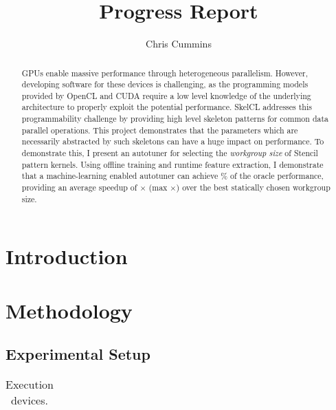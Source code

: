 
\title{Progress Report}

\author{Chris Cummins}





\maketitle

\begin{abstract}
  \noindent
  GPUs enable massive performance through heterogeneous
  parallelism. However, developing software for these devices is
  challenging, as the programming models provided by OpenCL and CUDA
  require a low level knowledge of the underlying architecture to
  properly exploit the potential performance. SkelCL addresses this
  programmability challenge by providing high level skeleton patterns
  for common data parallel operations. This project demonstrates that
  the parameters which are necessarily abstracted by such skeletons
  can have a huge impact on performance. To demonstrate this, I
  present an autotuner for selecting the \emph{workgroup size} of
  Stencil pattern kernels. Using offline training and runtime feature
  extraction, I demonstrate that a machine-learning enabled autotuner
  can achieve \% of the oracle performance, providing an
  average speedup of $\times$ (max $\times$) over
  the best statically chosen workgroup size.
\end{abstract}

\section{Introduction}

\section{Methodology}


\subsection{Experimental Setup}

\begin{table}
\footnotesize
\centering
\begin{tabular}{| L{1.2cm} | L{6.2cm} | L{1.5cm} | L{1.5cm} | L{1.5cm} | L{1.5cm} | L{1.5cm} |}
\hline

\hline
\end{tabular}
\caption{%
  Execution devices. %
}
\label{tab:hw}
\end{table}

